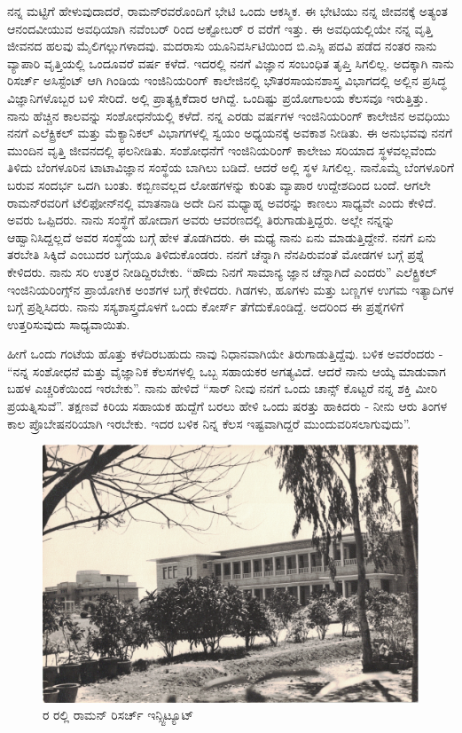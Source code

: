 ನನ್ನ ಮಟ್ಟಿಗೆ ಹೇಳುವುದಾದರೆ, ರಾಮನ್‍ರವರೊಂದಿಗೆ ಭೇಟಿ ಒಂದು ಆಕಸ್ಮಿಕ. ಈ ಭೇಟಿಯು ನನ್ನ ಜೀವನಕ್ಕೆ ಅತ್ಯಂತ ಆನಂದವೀಯುವ ಅವಧಿಯಾಗಿ ನವೆಂಬರ್ ರಿಂದ ಅಕ್ಟೋಬರ್ ರ ವರೆಗೆ ಇತ್ತು. ಈ ಅವಧಿಯಲ್ಲಿಯೇ ನನ್ನ ವೃತ್ತಿ ಜೀವನದ ಹಲವು ಮೈಲಿಗಲ್ಲುಗಳಾದವು. ಮದರಾಸು ಯೂನಿವರ್ಸಿಟಿಯಿಂದ ಬಿ.ಎಸ್ಸಿ ಪದವಿ ಪಡೆದ ನಂತರ ನಾನು ವ್ಯಾಪಾರಿ ವೃತ್ತಿಯಲ್ಲಿ ಒಂದೂವರೆ ವರ್ಷ ಕಳೆದೆ. ಇದರಲ್ಲಿ ನನಗೆ ವಿಜ್ಞಾನ ಸಂಬಂಧಿತ ತೃಪ್ತಿ ಸಿಗಲಿಲ್ಲ. ಅದಕ್ಕಾಗಿ ನಾನು ರಿಸರ್ಚ್ ಅಸಿಸ್ಟೆಂಟ್ ಆಗಿ ಗಿಂಡಿಯ ಇಂಜಿನಿಯರಿಂಗ್ ಕಾಲೇಜಿನಲ್ಲಿ ಭೌತರಸಾಯನಶಾಸ್ತ್ರ ವಿಭಾಗದಲ್ಲಿ ಅಲ್ಲಿನ ಪ್ರಸಿದ್ಧ ವಿಜ್ಞಾನಿಗಳೊಬ್ಬರ ಬಳಿ ಸೇರಿದೆ. ಅಲ್ಲಿ ಪ್ರಾತ್ಯಕ್ಷಿಕೆದಾರ ಆಗಿದ್ದೆ. ಒಂದಿಷ್ಟು ಪ್ರಯೋಗಾಲಯ ಕೆಲಸವೂ ಇರುತ್ತಿತ್ತು. ನಾನು ಹೆಚ್ಚಿನ ಕಾಲವನ್ನು ಸಂಶೋಧನೆಯಲ್ಲಿ ಕಳೆದೆ. ನನ್ನ ಎರಡು ವರ್ಷಗಳ ಇಂಜಿನಿಯರಿಂಗ್ ಕಾಲೇಜಿನ ಅವಧಿಯು ನನಗೆ ಎಲೆಕ್ಟ್ರಿಕಲ್ ಮತ್ತು ಮೆಕ್ಯಾನಿಕಲ್ ವಿಭಾಗಗಳಲ್ಲಿ ಸ್ವಯಂ ಅಧ್ಯಯನಕ್ಕೆ ಅವಕಾಶ ನೀಡಿತು. ಈ ಅನುಭವವು ನನಗೆ ಮುಂದಿನ ವೃತ್ತಿ ಜೀವನದಲ್ಲಿ ಫಲನೀಡಿತು. ಸಂಶೋಧನೆಗೆ ಇಂಜಿನಿಯರಿಂಗ್ ಕಾಲೇಜು ಸರಿಯಾದ ಸ್ಥಳವಲ್ಲವೆಂದು ತಿಳಿದು ಬೆಂಗಳೂರಿನ ಟಾಟಾವಿಜ್ಞಾನ ಸಂಸ್ಥೆಯ ಬಾಗಿಲು ಬಡಿದೆ. ಆದರೆ ಅಲ್ಲಿ ಸ್ಥಳ ಸಿಗಲಿಲ್ಲ. ನಾನೊಮ್ಮೆ ಬೆಂಗಳೂರಿಗೆ ಬರುವ ಸಂದರ್ಭ ಒದಗಿ ಬಂತು. ಕಬ್ಬಿಣವಲ್ಲದ ಲೋಹಗಳನ್ನು ಕುರಿತು ವ್ಯಾಪಾರ ಉದ್ದೇಶದಿಂದ ಬಂದೆ. ಆಗಲೇ ರಾಮನ್‍ರವರಿಗೆ ಟೆಲಿಫೋನ್‍ನಲ್ಲಿ ಮಾತನಾಡಿ ಅದೇ ದಿನ ಮಧ್ಯಾಹ್ನ ಅವರನ್ನು ಕಾಣಲು ಸಾಧ್ಯವೇ ಎಂದು ಕೇಳಿದೆ. ಅವರು ಒಪ್ಪಿದರು. ನಾನು ಸಂಸ್ಥೆಗೆ ಹೋದಾಗ ಅವರು ಆವರಣದಲ್ಲಿ ತಿರುಗಾಡುತ್ತಿದ್ದರು. ಅಲ್ಲೇ ನನ್ನನ್ನು ಆಹ್ವಾನಿಸಿದ್ದಲ್ಲದೆ ಅವರ ಸಂಸ್ಥೆಯ ಬಗ್ಗೆ ಹೇಳ ತೊಡಗಿದರು. ಈ ಮಧ್ಯೆ ನಾನು ಏನು ಮಾಡುತ್ತಿದ್ದೇನೆ. ನನಗೆ ಏನು ತರಬೇತಿ ಸಿಕ್ಕಿದೆ ಎಂಬುದರ ಬಗ್ಗೆಯೂ ತಿಳಿದುಕೊಂಡರು. ನನಗೆ ಚೆನ್ನಾಗಿ ನೆನಪಿರುವಂತೆ ಮೋಡಗಳ ಬಗ್ಗೆ ಪ್ರಶ್ನೆ ಕೇಳಿದರು. ನಾನು ಸರಿ ಉತ್ತರ ನೀಡಿದ್ದಿರಬೇಕು. “ಹೌದು ನಿನಗೆ ಸಾಮಾನ್ಯ ಜ್ಞಾನ ಚೆನ್ನಾಗಿದೆ ಎಂದರು” ಎಲೆಕ್ಟ್ರಿಕಲ್ ಇಂಜಿನಿಯರಿಂಗ್ಸ್‌ನ ಪ್ರಾಯೋಗಿಕ ಅಂಶಗಳ ಬಗ್ಗೆ ಕೇಳಿದರು. ಗಿಡಗಳು, ಹೂಗಳು ಮತ್ತು ಬಣ್ಣಗಳ ಉಗಮ ಇತ್ಯಾದಿಗಳ ಬಗ್ಗೆ ಪ್ರಶ್ನಿಸಿದರು. ನಾನು ಸಸ್ಯಶಾಸ್ತ್ರದೊಳಗೆ ಒಂದು ಕೋರ್ಸ್ ತೆಗೆದುಕೊಂಡಿದ್ದೆ. ಅದರಿಂದ ಈ ಪ್ರಶ್ನೆಗಳಿಗೆ ಉತ್ತರಿಸುವುದು ಸಾಧ್ಯವಾಯಿತು.

ಹೀಗೆ ಒಂದು ಗಂಟೆಯ ಹೊತ್ತು ಕಳೆದಿರಬಹುದು ನಾವು ನಿಧಾನವಾಗಿಯೇ ತಿರುಗಾಡುತ್ತಿದ್ದೆವು. ಬಳಿಕ ಅವರೆಂದರು - “ನನ್ನ ಸಂಶೋಧನೆ ಮತ್ತು ವೈಜ್ಞಾನಿಕ ಕೆಲಸಗಳಲ್ಲಿ ಒಬ್ಬ ಸಹಾಯಕರ ಅಗತ್ಯವಿದೆ. ಆದರೆ ನಾನು ಆಯ್ಕೆ ಮಾಡುವಾಗ ಬಹಳ ಎಚ್ಚರಿಕೆಯಿಂದ ಇರಬೇಕು”. ನಾನು ಹೇಳಿದೆ “ಸಾರ್ ನೀವು ನನಗೆ ಒಂದು ಚಾನ್ಸ್ ಕೊಟ್ಟರೆ ನನ್ನ ಶಕ್ತಿ ಮೀರಿ ಪ್ರಯತ್ನಿಸುವೆ”. ತಕ್ಷಣವೆ ಕಿರಿಯ ಸಹಾಯಕ ಹುದ್ದೆಗೆ ಬರಲು ಹೇಳಿ ಒಂದು ಷರತ್ತು ಹಾಕಿದರು - ನೀನು ಆರು ತಿಂಗಳ ಕಾಲ ಪ್ರೊಬೇಷನರಿಯಾಗಿ ಇರಬೇಕು. ಇದರ ಬಳಿಕ ನಿನ್ನ ಕೆಲಸ ಇಷ್ಟವಾಗಿದ್ದರೆ ಮುಂದುವರಿಸಲಾಗುವುದು”.

\begin{figure}
\includegraphics{"images/7.jpg"}
\caption{ರ ರಲ್ಲಿ ರಾಮನ್ ರಿಸರ್ಚ್ ಇನ್ಸ್ಟಿಟ್ಯೂಟ್}
\end{figure}

